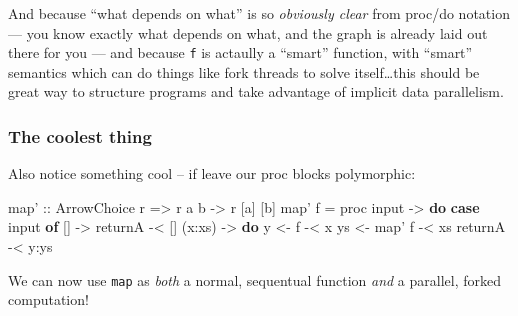 \documentclass[]{article}
\newenvironment{Shaded}{}{}
\newcommand{\DataTypeTok}[1]{\textcolor[rgb]{0.56,0.13,0.00}{#1}}
\newcommand{\DecValTok}[1]{\textcolor[rgb]{0.25,0.63,0.44}{#1}}
\newcommand{\FunctionTok}[1]{\textcolor[rgb]{0.02,0.16,0.49}{#1}}
\newcommand{\KeywordTok}[1]{\textcolor[rgb]{0.00,0.44,0.13}{\textbf{#1}}}
\newcommand{\NormalTok}[1]{#1}
\newcommand{\OtherTok}[1]{\textcolor[rgb]{0.00,0.44,0.13}{#1}}
\begin{document}
And because ``what depends on what'' is so \emph{obviously clear} from proc/do
notation --- you know exactly what depends on what, and the graph is already
laid out there for you --- and because \texttt{f} is actaully a ``smart''
function, with ``smart'' semantics which can do things like fork threads to
solve itself\ldots{}this should be great way to structure programs and take
advantage of implicit data parallelism.

\hypertarget{the-coolest-thing}{%
\subsubsection{The coolest thing}\label{the-coolest-thing}}

Also notice something cool -- if leave our proc blocks polymorphic:

\begin{Shaded}
\begin{Highlighting}[]
\OtherTok{map' ::} \DataTypeTok{ArrowChoice}\NormalTok{ r }\OtherTok{=>}\NormalTok{ r a b }\OtherTok{->}\NormalTok{ r [a] [b]}
\NormalTok{map' f }\FunctionTok{=}\NormalTok{ proc input }\OtherTok{->} \KeywordTok{do}
    \KeywordTok{case}\NormalTok{ input }\KeywordTok{of}
\NormalTok{      []     }\OtherTok{->}
\NormalTok{          returnA        }\FunctionTok{-<}\NormalTok{ []}
\NormalTok{      (x}\FunctionTok{:}\NormalTok{xs) }\OtherTok{->} \KeywordTok{do}
\NormalTok{          y  }\OtherTok{<-}\NormalTok{ f        }\FunctionTok{-<}\NormalTok{ x}
\NormalTok{          ys }\OtherTok{<-}\NormalTok{ map' f   }\FunctionTok{-<}\NormalTok{ xs}
\NormalTok{          returnA        }\FunctionTok{-<}\NormalTok{ y}\FunctionTok{:}\NormalTok{ys}
\end{Highlighting}
\end{Shaded}

We can now use \texttt{map\textquotesingle{}} as \emph{both} a normal,
sequentual function \emph{and} a parallel, forked computation!

\begin{Shaded}
\end{Shaded}
\end{document}

